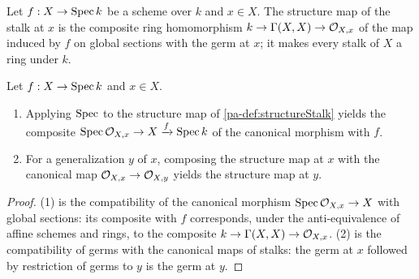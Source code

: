 \begin{definition}
  \label{pa-def:structureStalk}
  \leanok

  Let \(f : X \to \operatorname{Spec} k\) be a scheme over \(k\) and \(x \in X\). The structure map of
  the stalk at \(x\) is the composite ring homomorphism
  \(k \to \Gamma(X, X) \to \mathcal{O}_{X,x}\) of the map induced by \(f\) on global sections
  with the germ at \(x\); it makes every stalk of \(X\) a ring under \(k\).
\end{definition}

\begin{lemma}
  \label{pa-lem:structureStalk_coherence}
  \leanok

  Let \(f : X \to \operatorname{Spec} k\) and \(x \in X\).
  \begin{enumerate}
    \item Applying \(\operatorname{Spec}\) to the structure map of \ref{pa-def:structureStalk} yields the
      composite \(\operatorname{Spec} \mathcal{O}_{X,x} \to X \xrightarrow{f} \operatorname{Spec} k\) of the canonical
      morphism with \(f\).
    \item For a generalization \(y\) of \(x\), composing the structure map at \(x\) with
      the canonical map \(\mathcal{O}_{X,x} \to \mathcal{O}_{X,y}\) yields the structure map at
      \(y\).
  \end{enumerate}
\end{lemma}
\begin{proof}
  \leanok
  (1) is the compatibility of the canonical morphism \(\operatorname{Spec} \mathcal{O}_{X,x} \to X\) with
  global sections: its composite with \(f\) corresponds, under the anti-equivalence of
  affine schemes and rings, to the composite \(k \to \Gamma(X, X) \to \mathcal{O}_{X,x}\).
  (2) is the compatibility of germs with the canonical maps of stalks: the germ at \(x\)
  followed by restriction of germs to \(y\) is the germ at \(y\).
\end{proof}

